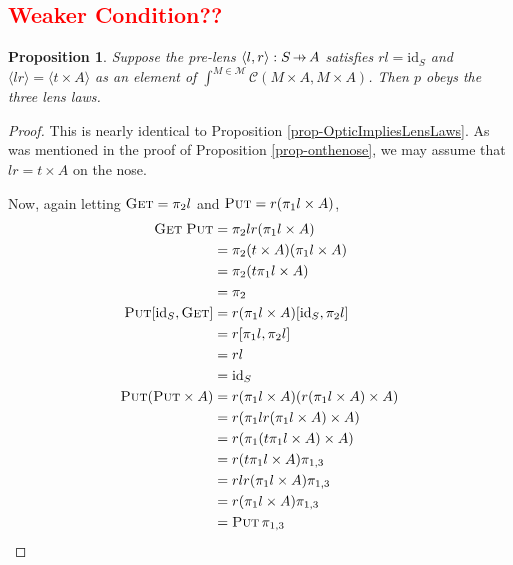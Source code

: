\documentclass[11pt,a4paper]{article}
\theoremstyle{plain}
\newtheorem{proposition}[theorem]{Proposition}
\theoremstyle{definition}
\newcommand{\C}{\mathscr{C}}
\newcommand{\M}{\mathscr{M}}
\newcommand{\id}{\mathrm{id}}
\newcommand{\fget}{\textsc{Get}}
\newcommand{\fput}{\textsc{Put}}
\newcommand{\hto}{\ensuremath{\,\mathaccent\shortmid\rightarrow\,}}
\newcommand{\todo}[1]{\textcolor{red}{\small #1}}
\begin{document}
\todo{
\section{Weaker Condition??}
}
\begin{proposition}
Suppose the pre-lens $\langle l, r \rangle : S \hto A$ satisfies $rl = \id_S$ and $\langle lr \rangle = \langle t \times A \rangle$ as an element of $\int^{M \in \M} \C(M \times A, M \times A)$. Then $p$ obeys the three lens laws.
\end{proposition}
\begin{proof}
This is nearly identical to Proposition \ref{prop-OpticImpliesLensLaws}. As was mentioned in the proof of Proposition \ref{prop-onthenose}, we may assume that $lr = t \times A$ on the nose.

Now, again letting $\fget = \pi_2 l$ and $\fput = r (\pi_1 l \times A)$,
\begin{align*}
\fget \; \fput 
&= \pi_2 l r (\pi_1 l \times A) \\
&= \pi_2 (t \times A) (\pi_1 l \times A) \\
&= \pi_2 (t \pi_1 l \times A) \\
&= \pi_2 \\
\fput [\id_S, \fget] 
&= r (\pi_1 l \times A) [\id_S, \pi_2 l] \\
&= r [\pi_1 l, \pi_2 l] \\
&= rl \\
&= \id_S \\
\fput (\fput \times A) 
&= r (\pi_1 l \times A) (r (\pi_1 l \times A) \times A) \\
&= r (\pi_1 l  r (\pi_1 l \times A) \times A) \\
&= r (\pi_1 (t\pi_1 l \times A) \times A) \\
&= r (t\pi_1 l \times A) \pi_{1,3} \\
&= r lr(\pi_1 l \times A) \pi_{1,3} \\
&= r(\pi_1 l \times A) \pi_{1,3} \\
&= \fput \, \pi_{1, 3}
\end{align*}
\end{proof}
\end{document}
